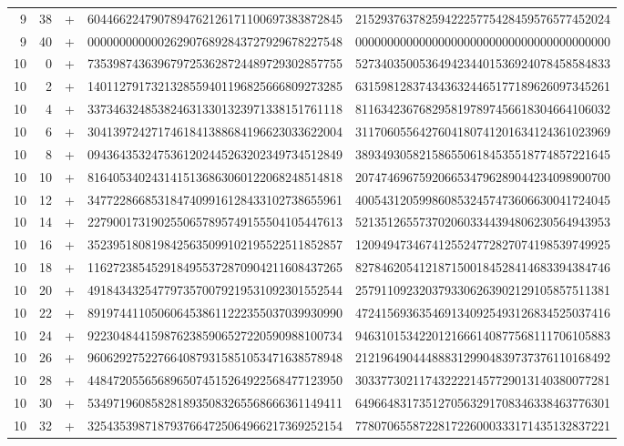 \begin{longtable}{rrrll}
9 & 38 & + & 6044662247907894762126171100697383872845 & 2152937637825942225775428459576577452024 \\
9 & 40 & + & 0000000000002629076892843727929678227548 & 0000000000000000000000000000000000000000 \\
10 & 0 & + & 7353987436396797253628724489729302857755 & 5273403500536494234401536924078458584833 \\
10 & 2 & + & 1401127917321328559401196825666809273285 & 6315981283743436324465177189626097345261 \\
10 & 4 & + & 3373463248538246313301323971338151761118 & 8116342367682958197897456618304664106032 \\
10 & 6 & + & 3041397242717461841388684196623033622004 & 3117060556427604180741201634124361023969 \\
10 & 8 & + & 0943643532475361202445263202349734512849 & 3893493058215865506184535518774857221645 \\
10 & 10 & + & 8164053402431415136863060122068248514818 & 2074746967592066534796289044234098900700 \\
10 & 12 & + & 3477228668531847409916128433102738655961 & 4005431205998608532457473606630041724045 \\
10 & 14 & + & 2279001731902550657895749155504105447613 & 5213512655737020603344394806230564943953 \\
10 & 16 & + & 3523951808198425635099102195522511852857 & 1209494734674125524772827074198539749925 \\
10 & 18 & + & 1162723854529184955372870904211608437265 & 8278462054121871500184528414683394384746 \\
10 & 20 & + & 4918434325477973570079219531092301552544 & 2579110923203793306263902129105857511381 \\
10 & 22 & + & 8919744110506064538611222355037039930990 & 4724156936354691340925493126834525037416 \\
10 & 24 & + & 9223048441598762385906527220590988100734 & 9463101534220121666140877568111706105883 \\
10 & 26 & + & 9606292752276640879315851053471638578948 & 2121964904448883129904839737376110168492 \\
10 & 28 & + & 4484720556568965074515264922568477123950 & 3033773021174322221457729013140380077281 \\
10 & 30 & + & 5349719608582818935083265568666361149411 & 6496648317351270563291708346338463776301 \\
10 & 32 & + & 3254353987187937664725064966217369252154 & 7780706558722817226000333171435132837221 \\

\end{longtable}
